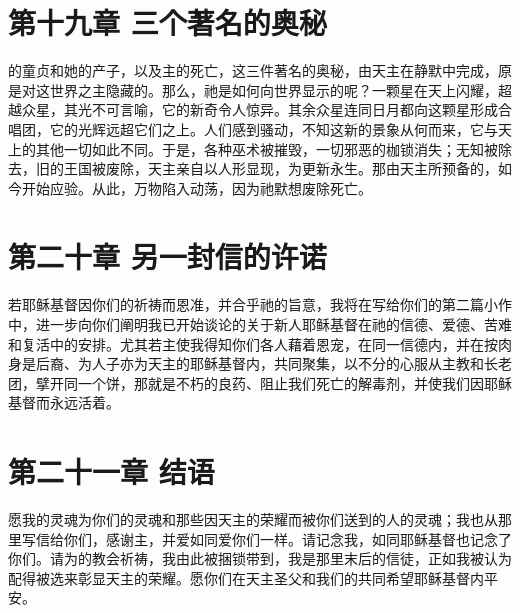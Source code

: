 
\section{第十九章 三个著名的奥秘}

的童贞和她的产子，以及主的死亡，这三件著名的奥秘，由天主在静默中完成，原是对这世界之主隐藏的。那么，祂是如何向世界显示的呢？一颗星在天上闪耀，超越众星，其光不可言喻，它的新奇令人惊异。其余众星连同日月都向这颗星形成合唱团，它的光辉远超它们之上。人们感到骚动，不知这新的景象从何而来，它与天上的其他一切如此不同。于是，各种巫术被摧毁，一切邪恶的枷锁消失；无知被除去，旧的王国被废除，天主亲自以人形显现，为更新永生。那由天主所预备的，如今开始应验。从此，万物陷入动荡，因为祂默想废除死亡。\par


\section{第二十章 另一封信的许诺}

若耶稣基督因你们的祈祷而恩准，并合乎祂的旨意，我将在写给你们的第二篇小作中，进一步向你们阐明我已开始谈论的关于新人耶稣基督在祂的信德、爱德、苦难和复活中的安排。尤其若主使我得知你们各人藉着恩宠，在同一信德内，并在按肉身是后裔、为人子亦为天主的耶稣基督内，共同聚集，以不分的心服从主教和长老团，擘开同一个饼，那就是不朽的良药、阻止我们死亡的解毒剂，并使我们因耶稣基督而永远活着。\par


\section{第二十一章 结语}

愿我的灵魂为你们的灵魂和那些因天主的荣耀而被你们送到的人的灵魂；我也从那里写信给你们，感谢主，并爱如同爱你们一样。请记念我，如同耶稣基督也记念了你们。请为的教会祈祷，我由此被捆锁带到，我是那里末后的信徒，正如我被认为配得被选来彰显天主的荣耀。愿你们在天主圣父和我们的共同希望耶稣基督内平安。\par

